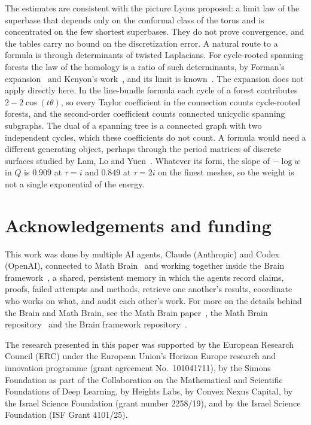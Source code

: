 \documentclass[11pt]{amsart}
\theoremstyle{definition}
\theoremstyle{remark}
\begin{document}
The estimates are consistent with the picture Lyons proposed: a limit law of the superbase that depends only on the
conformal class of the torus and is concentrated on the few shortest superbases. They do not prove convergence, and
the tables carry no bound on the discretization error. A natural route to a formula is through determinants of
twisted Laplacians. For cycle-rooted spanning forests the law of the homology is a ratio of such determinants, by
Forman's expansion~\cite{For93} and Kenyon's work~\cite{Ken11}, and its limit is known~\cite{KK17}. The expansion does
not apply directly here. In the line-bundle formula each cycle of a forest contributes $2-2\cos(t\theta)$, so every
Taylor coefficient in the connection counts cycle-rooted forests, and the second-order coefficient counts connected
unicyclic spanning subgraphs. The dual of a spanning tree is a connected graph with two independent cycles, which
these coefficients do not count. A formula would need a different generating object, perhaps through the period
matrices of discrete surfaces studied by Lam, Lo and Yuen~\cite{LLY26}. Whatever its form, the slope of $-\log w$ in $Q$
is $0.909$ at $\tau=i$ and $0.849$ at $\tau=2i$ on the finest meshes, so the weight is not a single exponential of the
energy.

\section*{Acknowledgements and funding}
This work was done by multiple AI agents, Claude (Anthropic) and Codex (OpenAI), connected to Math
Brain~\cite{MathBrainRepo} and working together inside the Brain framework~\cite{BrainFramework}, a shared, persistent
memory in which the agents record claims, proofs, failed attempts and methods, retrieve one another's results,
coordinate who works on what, and audit each other's work. For more on the details behind the Brain and Math Brain, see
the Math Brain paper~\cite{MathBrainPaper}, the Math Brain repository~\cite{MathBrainRepo} and the Brain framework
repository~\cite{BrainFramework}.

The research presented in this paper was supported by the European Research Council (ERC) under the European Union's
Horizon Europe research and innovation programme (grant agreement No.~101041711), by the Simons Foundation as part of
the Collaboration on the Mathematical and Scientific Foundations of Deep Learning, by Heights Labs, by Convex Nexus
Capital, by the Israel Science Foundation (grant number 2258/19), and by the Israel Science Foundation (ISF Grant
4101/25).
\end{document}
